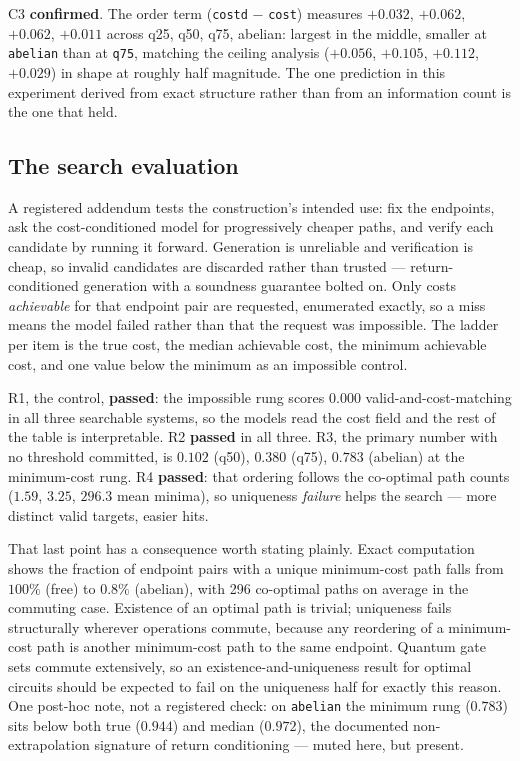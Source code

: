C3 \textbf{confirmed}. The order term (\texttt{costd} $-$ \texttt{cost}) measures $+0.032$, $+0.062$, $+0.062$, $+0.011$ across q25, q50, q75, abelian: largest in the middle, smaller at \texttt{abelian} than at \texttt{q75}, matching the ceiling analysis ($+0.056$, $+0.105$, $+0.112$, $+0.029$) in shape at roughly half magnitude. The one prediction in this experiment derived from exact structure rather than from an information count is the one that held.

\subsection{The search evaluation}

A registered addendum tests the construction's intended use: fix the endpoints, ask the cost-conditioned model for progressively cheaper paths, and verify each candidate by running it forward. Generation is unreliable and verification is cheap, so invalid candidates are discarded rather than trusted --- return-conditioned generation with a soundness guarantee bolted on. Only costs \emph{achievable} for that endpoint pair are requested, enumerated exactly, so a miss means the model failed rather than that the request was impossible. The ladder per item is the true cost, the median achievable cost, the minimum achievable cost, and one value below the minimum as an impossible control.

R1, the control, \textbf{passed}: the impossible rung scores $0.000$ valid-and-cost-matching in all three searchable systems, so the models read the cost field and the rest of the table is interpretable. R2 \textbf{passed} in all three. R3, the primary number with no threshold committed, is $0.102$ (q50), $0.380$ (q75), $0.783$ (abelian) at the minimum-cost rung. R4 \textbf{passed}: that ordering follows the co-optimal path counts ($1.59$, $3.25$, $296.3$ mean minima), so uniqueness \emph{failure} helps the search --- more distinct valid targets, easier hits.

That last point has a consequence worth stating plainly. Exact computation shows the fraction of endpoint pairs with a unique minimum-cost path falls from $100\%$ (free) to $0.8\%$ (abelian), with 296 co-optimal paths on average in the commuting case. Existence of an optimal path is trivial; uniqueness fails structurally wherever operations commute, because any reordering of a minimum-cost path is another minimum-cost path to the same endpoint. Quantum gate sets commute extensively, so an existence-and-uniqueness result for optimal circuits should be expected to fail on the uniqueness half for exactly this reason. One post-hoc note, not a registered check: on \texttt{abelian} the minimum rung ($0.783$) sits below both true ($0.944$) and median ($0.972$), the documented non-extrapolation signature of return conditioning --- muted here, but present.

